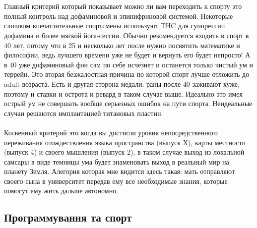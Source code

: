 \\
\\
Главный критерий который показывает можно ли вам переходить к спорту   это полный контроль над дофаминовой и эпинифриновой системой. Некоторые слишком впечатлительные спортсмены используют THC для суппрессии дофамина и более мягкой йога-сессии. Обычно рекомендуется входить в спорт в 40 лет, потому что в 25 и несколько лет после нужно посвятить математике и философии, ведь лучшего времени уже не будет и вернуть его будет непросто! А в 40 уже дофаминовый фон сам по себе исчезнет и останется только чистый ум и террейн. Это вторая безжалостная причина по которой спорт лучше отложить до adult возраста. Есть и другая сторона медали: раны после 40 заживают хуже, поэтому и ставки и острота и ревард в таком случае выше. Идеально   это имея острый ум не совершать вообще серьезных ошибок на пути спорта. Неидеальные случаи решаются имплантацией титановых пластин.
\\
\\
Коcвенный критерий   это когда вы достигли уровня непосредственного переживания отождествления языка пространства (выпуск Х), карты местности (выпуск 4) и своего мышления (выпуск 2), в таком случае выход из локальной самсары в виде темницы ума будет знаменовать выход в реальный мир на планету Земля. Алегория которая мне видится здесь такая: мать отправляют своего сына в университет передав ему все необходимые знания, которые помогут ему жить дальше автономно.

\subsection{Программування та спорт}

